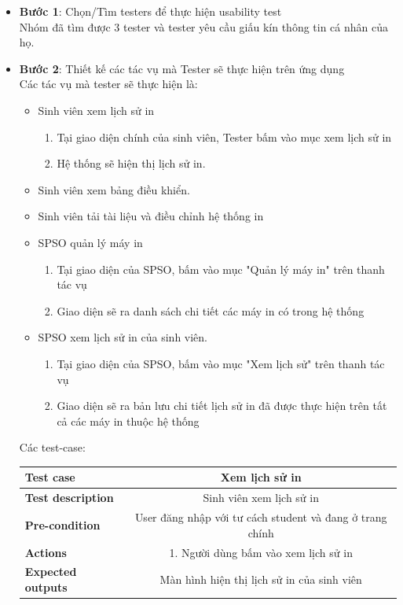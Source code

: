 \begin{itemize}
    \item \textbf{Bước 1}: Chọn/Tìm testers để thực hiện usability test \\ 
    Nhóm đã tìm được 3 tester và tester yêu cầu giấu kín thông tin cá nhân của họ.
    \item \textbf{Bước 2}: Thiết kế các tác vụ mà Tester sẽ thực hiện trên ứng dụng\\
    Các tác vụ mà tester sẽ thực hiện là:
    \begin{itemize}
        \item Sinh viên xem lịch sử in
        \begin{enumerate}
            \item Tại giao diện chính của sinh viên, Tester bấm vào mục xem lịch sử in
            \item Hệ thống sẽ hiện thị lịch sử in.
        \end{enumerate}
        \item Sinh viên xem bảng điều khiển.
        \item Sinh viên tải tài liệu và điều chỉnh hệ thống in
        \item SPSO quản lý máy in 
        \begin{enumerate}
            \item Tại giao diện của SPSO, bấm vào mục "Quản lý máy in" trên thanh tác vụ
            \item Giao diện sẽ ra danh sách chi tiết các máy in có trong hệ thống
        \end{enumerate}
        \item SPSO xem lịch sử in của sinh viên.
        \begin{enumerate}
            \item Tại giao diện của SPSO, bấm vào mục "Xem lịch sử" trên thanh tác vụ
            \item Giao diện sẽ ra bản lưu chi tiết lịch sử in đã được thực hiện trên tất cả các máy in thuộc hệ thống 
        \end{enumerate}
    \end{itemize}
     \newpage
    Các test-case:
    \begin{longtable}{|l|c|}
        \hline
        \textbf{Test case} & Xem lịch sử in \\
        \hline
        \textbf{Test description} & Sinh viên xem lịch sử in \\
        \hline
        \textbf{Pre-condition} & User đăng nhập với tư cách student và đang ở trang chính \\
        \hline
        \textbf{Actions} & 1. Người dùng bấm vào xem lịch sử in \\
        \hline
        \textbf{Expected outputs} & Màn hình hiện thị lịch sử in của sinh viên\\
        \hline
    \end{longtable}
    

\end{itemize}
